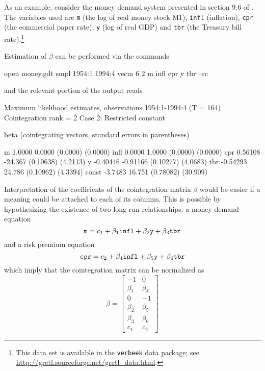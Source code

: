 As an example, consider the money demand system presented in section
9.6 of \cite{verbeek04}.  The variables used are \texttt{m} (the log of
real money stock M1), \texttt{infl} (inflation), \texttt{cpr} (the
commercial paper rate), \texttt{y} (log of real GDP) and \texttt{tbr}
(the Treasury bill rate).\footnote{This data set is available in the
  \texttt{verbeek} data package; see
  \url{http://gretl.sourceforge.net/gretl_data.html}.}

Estimation of $\beta$ can be performed via the commands
\begin{code}
open money.gdt 
smpl 1954:1 1994:4 
vecm 6 2 m infl cpr y tbr --rc
\end{code}
and the relevant portion of the output reads
\begin{code}
Maximum likelihood estimates, observations 1954:1-1994:4 (T = 164)
Cointegration rank = 2
Case 2: Restricted constant

beta (cointegrating vectors, standard errors in parentheses)

m           1.0000       0.0000 
           (0.0000)     (0.0000) 
infl        0.0000       1.0000 
           (0.0000)     (0.0000) 
cpr        0.56108      -24.367 
          (0.10638)     (4.2113) 
y         -0.40446     -0.91166 
          (0.10277)     (4.0683) 
tbr       -0.54293       24.786 
          (0.10962)     (4.3394) 
const      -3.7483       16.751 
          (0.78082)     (30.909) 
\end{code}
Interpretation of the coefficients of the cointegration matrix $\beta$
would be easier if a meaning could be attached to each of its
columns. This is possible by hypothesizing the existence of two
long-run relationships: a money demand equation
\[
  \mbox{\tt m} = c_1 + \beta_1 \mbox{\tt infl} + \beta_2 \mbox{\tt
    y} + \beta_3 \mbox{\tt tbr}
\]
and a risk premium equation
\[
 \mbox{\tt cpr} = c_2 + \beta_4 \mbox{\tt infl} +
   \beta_5 \mbox{\tt y} + \beta_6 \mbox{\tt tbr}
\]
which imply that the cointegration matrix can be normalized as
\[
  \beta = \left[
    \begin{array}{rr}
      -1 & 0 \\ \beta_1 & \beta_4 \\ 0 & -1 \\ \beta_2 & \beta_5
      \\ \beta_3 & \beta_6 \\ c_1 & c_2
    \end{array}
    \right]
\]

